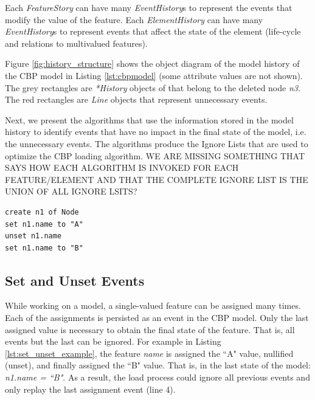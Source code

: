\documentclass{llncs}
\begin{document}
Each \emph{FeatureStory} can have many \emph{EventHistory}s  to represent the events that modify the value of the feature.
Each \emph{ElementHistory}  can have many \emph{EventHistory}s to represent events that affect the state of the element (life-cycle and relations to multivalued features).

Figure \ref{fig:history_structure} shows the object diagram of the model history of the CBP model in Listing \ref{lst:cbpmodel} (some attribute values are not shown).
The grey rectangles are \emph{*History} objects of that belong to the deleted node \emph{n3}.
The red rectangles are \emph{Line} objects that represent unnecessary events.

Next, we present the algorithms that use the information stored in the model history to identify events that have no impact in the final state of the model, i.e. the unnecessary events.
The algorithms produce the Ignore Lists that are used to optimize the CBP loading algorithm.
WE ARE MISSING SOMETHING THAT SAYS HOW EACH ALGORITHM IS INVOKED FOR EACH FEATURE/ELEMENT AND THAT THE COMPLETE IGNORE LIST IS THE UNION OF ALL IGNORE LSITS?

\begin{lstlisting}[style=eol,caption={The CBP representation of attribute \emph{name} assignments.},label=lst:set_unset_example]
create n1 of Node
set n1.name to "A"
unset n1.name
set n1.name to "B"
\end{lstlisting}

\subsection{Set and Unset Events}
\label{subsec:set_and_unset_events}
While working on a model, a single-valued feature can be assigned many times.
Each of the assignments is persisted as an event in the CBP model.
Only the last assigned value is necessary to obtain the final state of the feature. 
That is, all events but the last can be ignored.
For example in Listing \ref{lst:set_unset_example}, the feature \emph{name} is assigned the ``A" value, nullified (unset), and finally assigned the ``B" value.
That is, in the last state of the model: \emph{n1.name = ``B"}.
As a result, the load process could ignore all previous events and only replay the last assignment event (line 4). 
\end{document}
